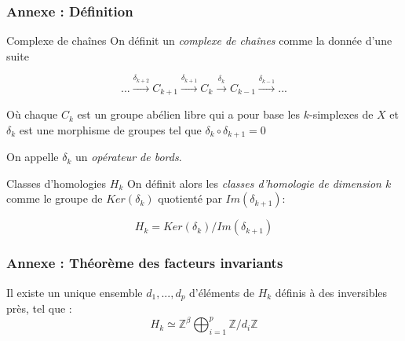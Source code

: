 \documentclass{beamer}
\begin{document}
\appendix

\begin{frame}
    \frametitle{Annexe : Définition}
    \begin{block}{Complexe de chaînes}
        On définit un \textit{complexe de chaînes} comme la donnée d'une suite 
    
        $$... \xrightarrow{\delta_{k+2}} C_{k+1} \xrightarrow{\delta_{k+1}} C_k \xrightarrow{\delta_k} C_{k-1} \xrightarrow{\delta_{k-1}} ...$$

        Où chaque $C_k$ est un groupe abélien libre qui a pour base les $k$-simplexes de $X$ et $\delta_k$ est une morphisme de groupes tel que $\delta_k \circ \delta_{k+1} = 0$
        
        On appelle $\delta_k$ un \textit{opérateur de bords}.

    \end{block}
    \begin{block}{Classes d'homologies $H_k$}
    On définit alors les \textit{classes d'homologie de dimension $k$} comme le groupe de $Ker(\delta_k)$ quotienté par $Im(\delta_{k+1})$:

    $$H_k = Ker(\delta_k) / Im(\delta_{k+1})$$
    \end{block}
\end{frame}

\begin{frame}
    \frametitle{Annexe : Théorème des facteurs invariants}
    Il existe un unique ensemble ${d_1, ..., d_p}$ d'éléments de $H_k$ définis à des inversibles près, tel que :
    $$H_k \simeq \mathbb{Z}^\beta \bigoplus_{i=1}^p \mathbb{Z} / d_i \mathbb{Z}$$
\end{frame}
\end{document}
